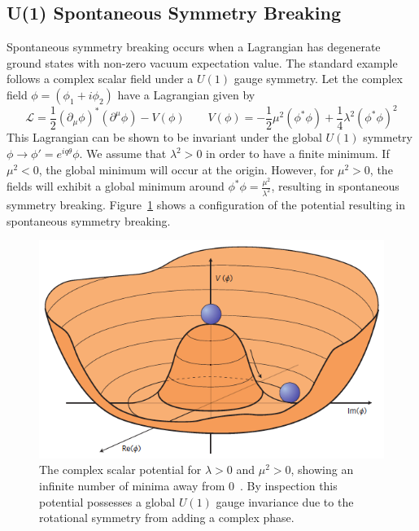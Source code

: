 \subsection{U(1) Spontaneous Symmetry Breaking} \label{sec:sm_theory_ssb}
Spontaneous symmetry breaking occurs when a Lagrangian has degenerate ground states with non-zero vacuum expectation value. The standard example follows a complex scalar field under a $U(1)$ gauge symmetry. Let the complex field $\phi=(\phi_1+i\phi_2)$ have a Lagrangian given by
\begin{equation}
	\mathcal{L}=\frac{1}{2}(\partial_\mu\phi)^*(\partial^\mu\phi)-V(\phi) \qquad V(\phi)=-\frac{1}{2}\mu^2(\phi^*\phi)+\frac{1}{4}\lambda^2(\phi^*\phi)^2
\end{equation}
This Lagrangian can be shown to be invariant under the global $U(1)$ symmetry $\phi\to\phi'= e^{iq\theta}\phi$. We assume that $\lambda^2>0$ in order to have a finite minimum. If $\mu^2<0$, the global minimum will occur at the origin. However, for $\mu^2>0$, the fields will exhibit a global minimum around $\phi^*\phi=\frac{\mu^2}{\lambda^2}$, resulting in spontaneous symmetry breaking. Figure~\ref{fig:higgs_ssb} shows a configuration of the potential resulting in spontaneous symmetry breaking.
\begin{figure}[htb!]
	\centering
	\includegraphics[width=0.65\linewidth]{figs/02_theory/higgspotential.png}
	\caption[The complex scalar potential for $\lambda^2>0$ and $\mu^2>0$, showing an infinite number of minima away from 0~\cite{higgspotential}. By inspection this potential possesses a global $U(1)$ gauge invariance due to the rotational symmetry from adding a complex phase.]{The complex scalar potential for $\lambda>0$ and $\mu^2>0$, showing an infinite number of minima away from 0~\cite{higgspotential}. By inspection this potential possesses a global $U(1)$ gauge invariance due to the rotational symmetry from adding a complex phase.}
	\label{fig:higgs_ssb}
\end{figure}

